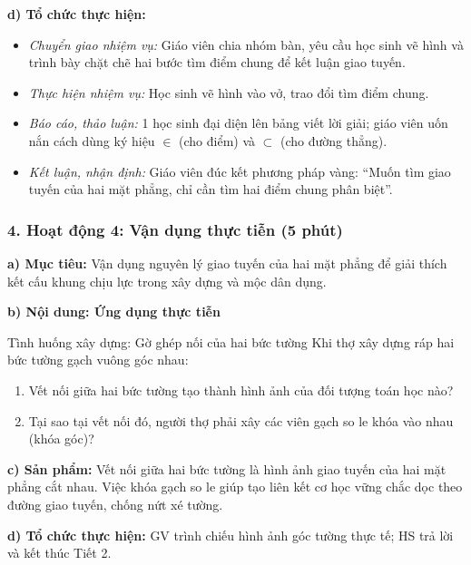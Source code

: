 \documentclass[12pt, a4paper]{article}
\begin{document}
\noindent \textbf{d) Tổ chức thực hiện:}
\begin{itemize}[leftmargin=0.8cm]
    \item \textit{Chuyển giao nhiệm vụ:} Giáo viên chia nhóm bàn, yêu cầu học sinh vẽ hình và trình bày chặt chẽ hai bước tìm điểm chung để kết luận giao tuyến.
    \item \textit{Thực hiện nhiệm vụ:} Học sinh vẽ hình vào vở, trao đổi tìm điểm chung.
    \item \textit{Báo cáo, thảo luận:} 1 học sinh đại diện lên bảng viết lời giải; giáo viên uốn nắn cách dùng ký hiệu $\in$ (cho điểm) và $\subset$ (cho đường thẳng).
    \item \textit{Kết luận, nhận định:} Giáo viên đúc kết phương pháp vàng: ``Muốn tìm giao tuyến của hai mặt phẳng, chỉ cần tìm hai điểm chung phân biệt''.
\end{itemize}

\subsubsection*{4. Hoạt động 4: Vận dụng thực tiễn (5 phút)}

\noindent \textbf{a) Mục tiêu:}
Vận dụng nguyên lý giao tuyến của hai mặt phẳng để giải thích kết cấu khung chịu lực trong xây dựng và mộc dân dụng.

\noindent \textbf{b) Nội dung: Ứng dụng thực tiễn}
\begin{pedabox}{Tình huống xây dựng: Gờ ghép nối của hai bức tường}
Khi thợ xây dựng ráp hai bức tường gạch vuông góc nhau:
\begin{enumerate}[leftmargin=0.6cm]
    \item Vết nối giữa hai bức tường tạo thành hình ảnh của đối tượng toán học nào?
    \item Tại sao tại vết nối đó, người thợ phải xây các viên gạch so le khóa vào nhau (khóa góc)?
\end{enumerate}
\end{pedabox}

\noindent \textbf{c) Sản phẩm:}
Vết nối giữa hai bức tường là hình ảnh giao tuyến của hai mặt phẳng cắt nhau. Việc khóa gạch so le giúp tạo liên kết cơ học vững chắc dọc theo đường giao tuyến, chống nứt xé tường.

\noindent \textbf{d) Tổ chức thực hiện:}
GV trình chiếu hình ảnh góc tường thực tế; HS trả lời và kết thúc Tiết 2.

\newpage
\end{document}
